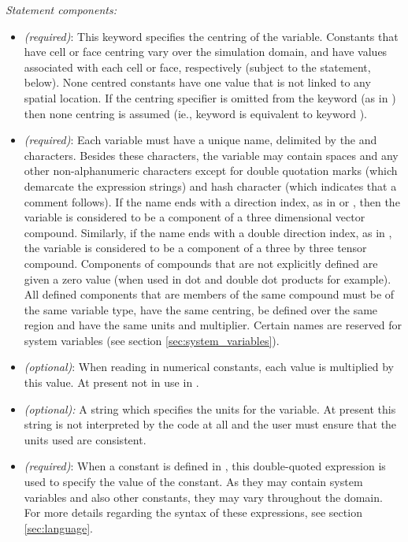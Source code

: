 \emph{Statement components:}

\begin{itemize}
\item {} \emph{(required)}:  This keyword specifies the centring of the variable.  Constants that have cell or face centring vary over the simulation domain, and have values associated with each cell or face, respectively (subject to the  statement, below).  None centred constants have one value that is not linked to any spatial location.  If the centring specifier is omitted from the keyword (as in ) then none centring is assumed (ie., keyword  is equivalent to keyword ).
\item {} \emph{(required)}:  Each variable must have a unique name, delimited by the \code{<} and \code{>} characters.  Besides these characters, the variable may contain spaces and any other non-alphanumeric characters except for double quotation marks  (which demarcate the expression strings) and hash character \code{\#} (which indicates that a comment follows).  If the name ends with a direction index, as in  or , then the variable is considered to be a component of a three dimensional vector compound.  Similarly, if the name ends with a double direction index, as in , the variable is considered to be a component of a three by three tensor compound.  Components of compounds that are not explicitly defined are given a zero value (when used in dot and double dot products for example).  All defined components that are members of the same compound must be of the same variable type, have the same centring, be defined over the same region and have the same units and multiplier.  Certain names are reserved for system variables (see section \ref{sec:system_variables}).
\item {} \emph{(optional)}:  When reading in numerical constants, each value is multiplied by this value.  At present not in use in .
\item {} \emph{(optional):}  A string which specifies the units for the variable.  At present this string is not interpreted by the code at all and the user must ensure that the units used are consistent.
\item {} \emph{(required)}:  When a constant is defined in , this double-quoted expression is used to specify the value of the constant.  As they may contain system variables and also other constants, they may vary throughout the domain.  For more details regarding the syntax of these expressions, see section \ref{sec:language}.

\end{itemize}
